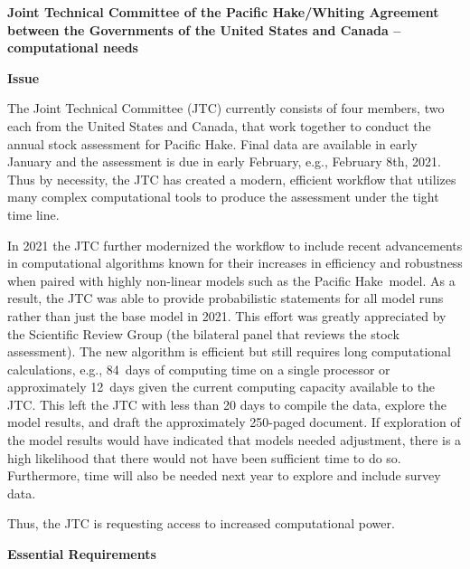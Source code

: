 \documentclass[12pt]{book}\usepackage[]{graphicx}\usepackage[]{color}
\newcommand{\fishname}{Pacific Hake}
\begin{document}
\begin{center}
  {\bf \Large Joint Technical Committee of the \fishname/Whiting Agreement between
    the Governments of the United States and Canada -- computational needs}
\end{center}

{\bf Issue}

The Joint Technical Committee (JTC) currently consists of four members, two each
from the United States and Canada, that work together to conduct the annual stock assessment
for \fishname. Final data are available in early
January and the assessment is due in early February, e.g., February 8th, 2021.
Thus by necessity, the JTC has created a modern, efficient workflow that utilizes many complex
computational tools to produce the assessment under the tight time line.

In 2021 the JTC further modernized the workflow to include recent advancements in computational algorithms
known for their increases in efficiency and robustness when paired with
highly non-linear models such as the \fishname\ model.
As a result, the JTC was able to provide probabilistic statements
for all model runs rather than just the base model in 2021.
This effort was greatly appreciated by the
Scientific Review Group (the bilateral panel that reviews the stock
assessment). The new algorithm is efficient but still requires long computational calculations,
e.g., 84~days of computing time on a single processor or approximately
12~days given the current computing capacity available to the JTC.
This left the JTC with less than 20 days to
compile the data,
explore the model results, and
draft the approximately 250-paged document.
If exploration of the model results would have
indicated that models needed adjustment, there is a high likelihood that there would
not have been sufficient time to do so. Furthermore, time will also be needed next
year to explore and include survey data.

Thus, the JTC is requesting access to increased computational power.

{\bf Essential Requirements}
\end{document}
